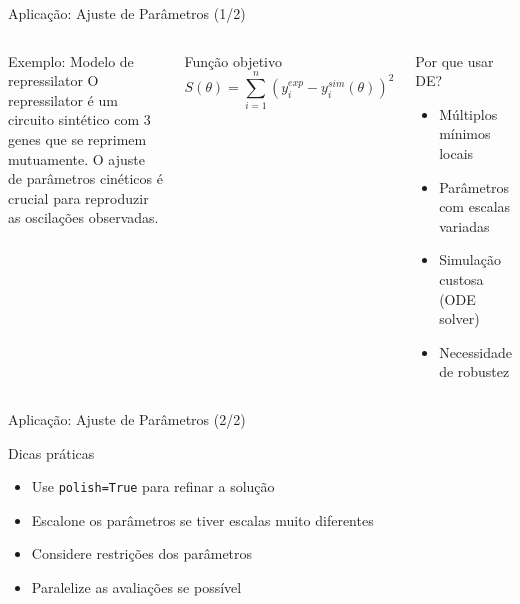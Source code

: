 \begin{frame}{Aplicação: Ajuste de Parâmetros (1/2)}
\begin{columns}
\begin{block}{Exemplo: Modelo de repressilator}
O repressilator é um circuito sintético com 3 genes que se reprimem mutuamente. O ajuste de parâmetros cinéticos é crucial para reproduzir as oscilações observadas.
\end{block}

\vspace{0.3cm}
\begin{block}{Função objetivo}
$$S(\theta) = \sum_{i=1}^{n} (y_i^{exp} - y_i^{sim}(\theta))^2$$
\end{block}

\begin{block}{Por que usar DE?}
\begin{itemize}
    \item Múltiplos mínimos locais
    \item Parâmetros com escalas variadas
    \item Simulação custosa (ODE solver)
    \item Necessidade de robustez
\end{itemize}
\end{block}
\end{columns}
\end{frame}

\begin{frame}{Aplicação: Ajuste de Parâmetros (2/2)}
\begin{block}{Dicas práticas}
\begin{itemize}
    \item Use \texttt{polish=True} para refinar a solução
    \item Escalone os parâmetros se tiver escalas muito diferentes
    \item Considere restrições dos parâmetros
    \item Paralelize as avaliações se possível
\end{itemize}
\end{block}

\end{frame}

